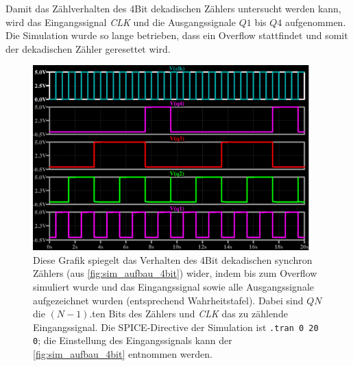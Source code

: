 \documentclass[12pt,english,ngerman]{scrartcl}
\begin{document}
Damit das Zählverhalten des 4Bit dekadischen Zählers untersucht werden kann,
wird das Eingangssignal \textit{CLK} und die Ausgangssignale $Q1$ bis $Q4$
aufgenommen. Die Simulation wurde so lange betrieben, dass ein Overflow
stattfindet und somit der dekadischen Zähler geresettet wird. 

\begin{figure}[H]
  \centering
    \includegraphics[width=0.95\textwidth]{./figures/sim/4bit/4bitdekawahrheit.png}
  \caption{Diese Grafik spiegelt das Verhalten des
    4Bit dekadischen synchron Zählers (aus \autoref{fig:sim_aufbau_4bit})
    wider, indem bis zum Overflow simuliert wurde und das Eingangssignal sowie
    alle Ausgangssignale aufgezeichnet wurden (entsprechend Wahrheitstafel).
    Dabei sind $QN$ die $(N-1)$.ten Bits des Zählers und \textit{CLK} das zu zählende
    Eingangssignal. Die SPICE-Directive der Simulation ist \texttt{.tran 0 20 0}; die
    Einstellung des Eingangssignals kann der \autoref{fig:sim_aufbau_4bit}
    entnommen werden.}
  \label{fig:sim_alarm_wahrheit}
\end{figure}


\end{document}
